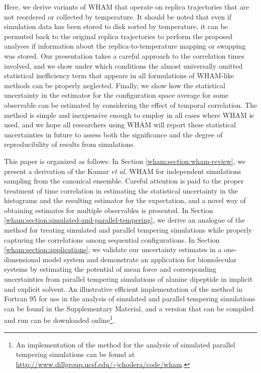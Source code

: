 Here, we derive variants of WHAM that operate on replica trajectories that are not reordered or collected by temperature.  It should be noted that even if simulation data has been stored to disk sorted by temperature, it can be permuted back to the original replica trajectories to perform the proposed analyses if information about the replica-to-temperature mapping or swapping was stored.  Our presentation takes a careful approach to the correlation times involved, and we show under which conditions the almost universally omitted statistical inefficiency term that appears in all formulations of WHAM-like methods can be properly neglected.  Finally, we show how the statistical uncertainty in the estimator for the configuration space average for some observable can be estimated by considering the effect of temporal correlation.  The method is simple and inexpensive enough to employ in all cases where WHAM is used, and we hope all researchers using WHAM will report these statistical uncertainties in future to assess both the significance and the degree of reproducibility of results from simulations.

This paper is organized as follows: In Section \ref{wham:section:wham-review}, we present a derivation of the Kumar \emph{et al.} WHAM for independent simulations sampling from the canonical ensemble.  Careful attention is paid to the proper treatment of time correlation in estimating the statistical uncertainty in the histograms and the resulting estimator for the expectation, and a novel way of obtaining estimates for multiple observables is presented.  In Section \ref{wham:section:simulated-and-parallel-tempering}, we derive an analogue of the method for treating simulated and parallel tempering simulations while properly capturing the correlations among sequential configurations. In Section \ref{wham:section:applications}, we validate our uncertainty estimates in a one-dimensional model system and demonstrate an application for biomolecular systems by estimating the potential of mean force and corresponding uncertainties from parallel tempering simulations of alanine dipeptide in implicit and explicit solvent.  An illustrative efficient implementation of the method in Fortran 95 for use in the analysis of simulated and parallel tempering simulations can be found in the Supplementary Material, and a version that can be compiled and run can be downloaded online\footnote{An implementation of the method for the analysis of simulated parallel tempering simulations can be found at \url{http://www.dillgroup.ucsf.edu/~jchodera/code/wham}.}.

